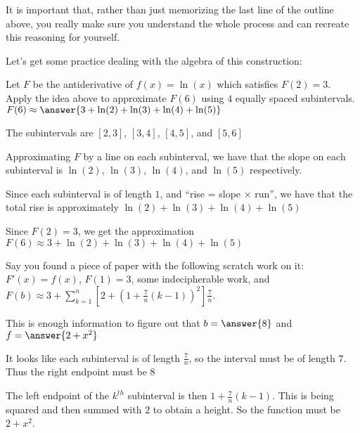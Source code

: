 \documentclass{ximera}
\begin{document}
	It is important that, rather than just memorizing the last line of the outline above, you really make sure you understand the whole process and can recreate this reasoning for yourself.  
	
	Let's get some practice dealing with the algebra of this construction:
	
	\begin{question}
		Let $F$ be the antiderivative of $f(x) = \ln(x)$ which satisfies $F(2) = 3$.  Apply the idea above to approximate $F(6)$ using $4$ equally spaced subintervals.  $F(6) \approx \answer{3+ \ln(2) + \ln(3) + \ln(4) + \ln(5)}$
		\begin{hint}
			The subintervals are $[2,3]$, $[3,4]$, $[4,5]$, and $[5,6]$
		\end{hint}
		\begin{hint}
			Approximating $F$ by a line on each subinterval, we have that the slope on each subinterval is $\ln(2)$, $\ln(3)$, $\ln(4)$,  and $\ln(5)$ respectively.
		\end{hint}
		\begin{hint}
			Since each subinterval is of length $1$, and ``rise = slope $\times$ run'', we have that the total rise is approximately $\ln(2) + \ln(3) + \ln(4) + \ln(5)$ 
		\end{hint}
		\begin{hint}
			Since $F(2) = 3$, we get the approximation $F(6) \approx 3+ \ln(2) + \ln(3) + \ln(4) + \ln(5)$
		\end{hint}
	\end{question}
	
	\begin{question}
		Say you found a piece of paper with the following scratch work on it: $F'(x) =f(x)$,  $F(1) = 3$, some indecipherable work, and $F(b) \approx 3 + \sum_{k=1}^{n} \left[2+ ( 1+ \frac{7}{n}(k-1))^2 \right ] \frac{7}{n}$.
		
		This is enough information to figure out that $b = \answer{8}$   and $f = \answer{2+x^2}$
		\begin{hint}
			It looks like each subinterval is of length $\frac{7}{n}$, so the interval must be of length $7$.  Thus the right endpoint must be $8$
		\end{hint}
		\begin{hint}
			The left endpoint of the $k^{th}$ subinterval is then $1+ \frac{7}{n}(k-1)$.  This is being squared and then summed with $2$ to obtain a height.  So the function must be $2+x^2$.
		\end{hint}
	\end{question}
\end{document}
